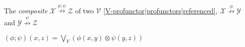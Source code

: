 
The \emph{composite} $\mathcal{X}\overset{\phi;\psi}\nrightarrow \mathcal{Z}$ of two $\mathcal{V}$ \ref{V-profunctor|profunctors|referenced}, $\mathcal{X}\overset{\phi}\nrightarrow\mathcal{Y}$ and $\mathcal{Y}\overset{\psi}\nrightarrow\mathcal{Z}$

$(\phi;\psi)(x,z) = \bigvee_Y(\phi(x,y)\otimes\psi(y,z))$
